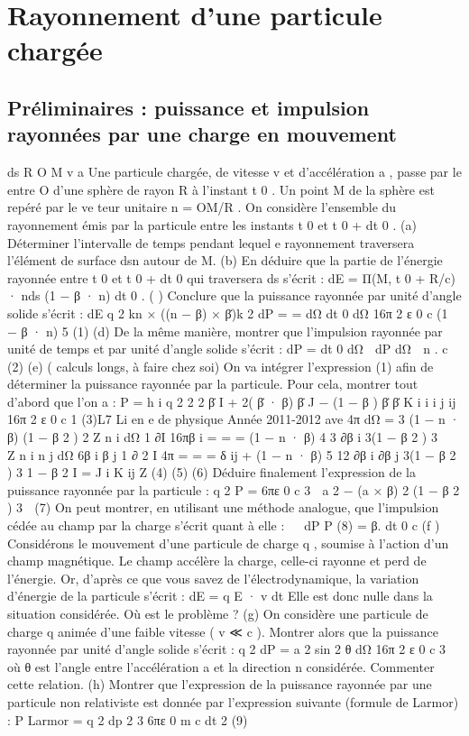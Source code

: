 
\section{Rayonnement d'une particule chargée}%
\subsection{Préliminaires : puissance et impulsion rayonnées par une charge en mouvement}%
ds
R
O
M
v
a
Une particule chargée, de vitesse v et d'accélération a , passe par le entre O d'une sphère de
rayon R à l'instant t 0 . Un point M de la sphère est repéré par le ve teur unitaire n = OM/R .
On considère l'ensemble du rayonnement émis par la particule entre les instants t 0 et t 0 + dt 0 .
(a) Déterminer l'intervalle de temps pendant lequel e rayonnement traversera l'élément de
surface dsn autour de M.
(b) En déduire que la partie de l'énergie rayonnée entre t 0 et t 0 + dt 0 qui traversera ds s'écrit :
dE = Π(M, t 0 + R/c) · nds (1 − β · n) dt 0 .
( ) Conclure que la puissance rayonnée par unité d'angle solide s'écrit :
dE
q 2 kn × ((n − β) × β̇)k 2
dP
=
=
dΩ
dt 0 dΩ
16π 2 ε 0 c
(1 − β · n) 5
(1)
(d) De la même manière, montrer que l'impulsion rayonnée par unité de temps et par unité
d'angle solide s'écrit :
dP
=
dt 0 dΩ

dP
dΩ

n
.
c
(2)
(e) ( calculs longs, à faire chez soi) On va intégrer l'expression (1) afin de déterminer la puissance
rayonnée par la particule. Pour cela, montrer tout d'abord que l'on a :
P =
h
i
q 2
2
2
β̇
I
+
2(
β̇
·
β)
β̇
J
−
(1
−
β
)
β̇
β̇
K
i
i
i
j
ij
16π 2 ε 0 c
1
(3)L7
Li en e de physique
Année 2011-2012
ave
4π
dΩ
=
3
(1 − n · β)
(1 − β 2 ) 2
Z
n i dΩ
1 ∂I
16πβ i
=
=
=
(1 − n · β) 4
3 ∂β i
3(1 − β 2 ) 3


Z
n i n j dΩ
6β i β j
1 ∂ 2 I
4π
=
=
=
δ ij +
(1 − n · β) 5
12 ∂β i ∂β j
3(1 − β 2 ) 3
1 − β 2
I =
J i
K ij
Z
(4)
(5)
(6)
Déduire finalement l'expression de la puissance rayonnée par la particule :
q 2
P =
6πε 0 c 3

a 2 − (a × β) 2
(1 − β 2 ) 3

(7)
On peut montrer, en utilisant une méthode analogue, que l'impulsion cédée au champ par la
charge s'écrit quant à elle :
 
dP
P
(8)
=
β.
dt 0
c
(f ) Considérons le mouvement d'une particule de charge q , soumise à l'action d'un champ magnétique. Le champ accélère la charge, celle-ci rayonne et perd de l'énergie. Or, d'après ce que
vous savez de l'électrodynamique, la variation d'énergie de la particule s'écrit :
dE
= q E · v
dt
Elle est donc nulle dans la situation considérée. Où est le problème ?
(g) On considère une particule de charge q animée d'une faible vitesse ( v ≪ c ). Montrer alors
que la puissance rayonnée par unité d'angle solide s'écrit :
q 2
dP
=
a 2 sin 2 θ
dΩ
16π 2 ε 0 c 3
où θ est l'angle entre l'accélération a et la direction n considérée. Commenter cette relation.
(h) Montrer que l'expression de la puissance rayonnée par une particule non relativiste est donnée
par l'expression suivante (formule de Larmor) :
P Larmor =
q 2
dp
2
3
6πε 0 m c
dt
2
(9)
